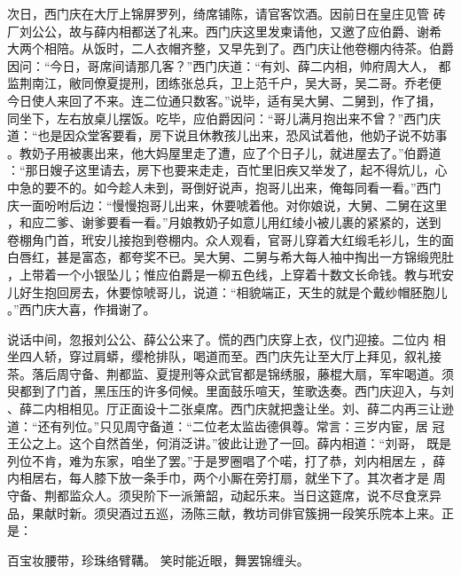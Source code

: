 次日，西门庆在大厅上锦屏罗列，绮席铺陈，请官客饮酒。因前日在皇庄见管
砖厂刘公公，故与薛内相都送了礼来。西门庆这里发柬请他，又邀了应伯爵、谢希
大两个相陪。从饭时，二人衣帽齐整，又早先到了。西门庆让他卷棚内待茶。伯爵
因问：“今日，哥席间请那几客？”西门庆道：“有刘、薛二内相，帅府周大人，
都监荆南江，敝同僚夏提刑，团练张总兵，卫上范千户，吴大哥，吴二哥。乔老便
今日使人来回了不来。连二位通只数客。”说毕，适有吴大舅、二舅到，作了揖，
同坐下，左右放桌儿摆饭。吃毕，应伯爵因问：“哥儿满月抱出来不曾？”西门庆
道：“也是因众堂客要看，房下说且休教孩儿出来，恐风试着他，他奶子说不妨事
。教奶子用被裹出来，他大妈屋里走了遭，应了个日子儿，就进屋去了。”伯爵道
：“那日嫂子这里请去，房下也要来走走，百忙里旧疾又举发了，起不得炕儿，心
中急的要不的。如今趁人未到，哥倒好说声，抱哥儿出来，俺每同看一看。”西门
庆一面吩咐后边：“慢慢抱哥儿出来，休要唬着他。对你娘说，大舅、二舅在这里
，和应二爹、谢爹要看一看。”月娘教奶子如意儿用红绫小被儿裹的紧紧的，送到
卷棚角门首，玳安儿接抱到卷棚内。众人观看，官哥儿穿着大红缎毛衫儿，生的面
白唇红，甚是富态，都夸奖不已。吴大舅、二舅与希大每人袖中掏出一方锦缎兜肚
，上带着一个小银坠儿；惟应伯爵是一柳五色线，上穿着十数文长命钱。教与玳安
儿好生抱回房去，休要惊唬哥儿，说道：“相貌端正，天生的就是个戴纱帽胚胞儿
。”西门庆大喜，作揖谢了。

说话中间，忽报刘公公、薛公公来了。慌的西门庆穿上衣，仪门迎接。二位内
相坐四人轿，穿过肩蟒，缨枪排队，喝道而至。西门庆先让至大厅上拜见，叙礼接
茶。落后周守备、荆都监、夏提刑等众武官都是锦绣服，藤棍大扇，军牢喝道。须
臾都到了门首，黑压压的许多伺候。里面鼓乐喧天，笙歌迭奏。西门庆迎入，与刘
、薛二内相相见。厅正面设十二张桌席。西门庆就把盏让坐。刘、薛二内再三让逊
道：“还有列位。”只见周守备道：“二位老太监齿德俱尊。常言：三岁内宦，居
冠王公之上。这个自然首坐，何消泛讲。”彼此让逊了一回。薛内相道：“刘哥，
既是列位不肯，难为东家，咱坐了罢。”于是罗圈唱了个喏，打了恭，刘内相居左
，薛内相居右，每人膝下放一条手巾，两个小厮在旁打扇，就坐下了。其次者才是
周守备、荆都监众人。须臾阶下一派箫韶，动起乐来。当日这筵席，说不尽食烹异
品，果献时新。须臾酒过五巡，汤陈三献，教坊司俳官簇拥一段笑乐院本上来。正
是：

百宝妆腰带，珍珠络臂鞲。
笑时能近眼，舞罢锦缠头。

